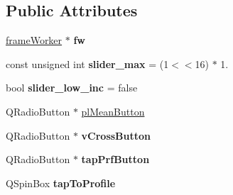\subsection*{Public Attributes}
\begin{DoxyCompactItemize}
\item 
\hypertarget{classfft__widget_ab996ba2300e6b99294c9272b62c0e94b}{\hyperlink{classframeWorker}{frame\+Worker} $\ast$ {\bfseries fw}}\label{classfft__widget_ab996ba2300e6b99294c9272b62c0e94b}

\item 
\hypertarget{classfft__widget_a5ed98f42780dbe0da6673e774a84cc76}{const unsigned int {\bfseries slider\+\_\+max} = (1$<$$<$16) $\ast$ 1.}\label{classfft__widget_a5ed98f42780dbe0da6673e774a84cc76}

\item 
\hypertarget{classfft__widget_ac6b02c8e88449f47116fee89ce0835a3}{bool {\bfseries slider\+\_\+low\+\_\+inc} = false}\label{classfft__widget_ac6b02c8e88449f47116fee89ce0835a3}

\end{DoxyCompactItemize}
{\bf }\par
\begin{DoxyCompactItemize}
\item 
Q\+Radio\+Button $\ast$ \hyperlink{classfft__widget_a54cb83db9f4f54be83c769e7c76be019}{pl\+Mean\+Button}
\item 
\hypertarget{classfft__widget_a9ffe19ab0f18e66480ed26b0906a0aab}{Q\+Radio\+Button $\ast$ {\bfseries v\+Cross\+Button}}\label{classfft__widget_a9ffe19ab0f18e66480ed26b0906a0aab}

\item 
\hypertarget{classfft__widget_a63e34a7b9766abfbec6cca242ad2af4c}{Q\+Radio\+Button $\ast$ {\bfseries tap\+Prf\+Button}}\label{classfft__widget_a63e34a7b9766abfbec6cca242ad2af4c}

\item 
\hypertarget{classfft__widget_ac01bfe376b1004afc187b72469b966cc}{Q\+Spin\+Box {\bfseries tap\+To\+Profile}}\label{classfft__widget_ac01bfe376b1004afc187b72469b966cc}

\end{DoxyCompactItemize}



